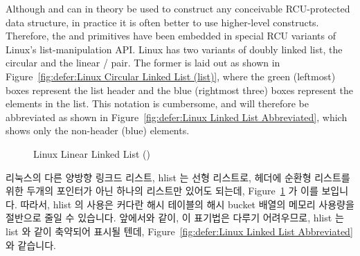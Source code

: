 Although  and
 can in theory be used to construct any
conceivable RCU-protected data structure, in practice it is often better
to use higher-level constructs.
Therefore, the  and
primitives have been embedded in special RCU variants of Linux's
list-manipulation API.
Linux has two variants of doubly linked list, the circular
 and the linear
/ pair.
The former is laid out as shown in
Figure~\ref{fig:defer:Linux Circular Linked List (list)},
where the green (leftmost) boxes represent the list header and the blue
(rightmost three) boxes represent the elements in the list.
This notation is cumbersome, and will therefore be abbreviated as shown in
Figure~\ref{fig:defer:Linux Linked List Abbreviated},
which shows only the non-header (blue) elements.
\fi

\begin{figure}[tb]
\centering
{}
\caption{Linux Linear Linked List ()}
\label{fig:defer:Linux Linear Linked List (hlist)}
\end{figure}

리눅스의 다른 양방향 링크드 리스트, hlist 는 선형 리스트로, 헤더에 순환형
리스트를 위한 두개의 포인터가 아닌 하나의 리스트만 있어도 되는데,
Figure~\ref{fig:defer:Linux Linear Linked List (hlist)} 가 이를 보입니다.
따라서, hlist 의 사용은 커다란 해시 테이블의 해시 bucket 배열의 메모리 사용량을
절반으로 줄일 수 있습니다.
앞에서와 같이, 이 표기법은 다루기 어려우므로, hlist 는 list 와 같이 축약되어
표시될 텐데,
Figure~\ref{fig:defer:Linux Linked List Abbreviated} 와 같습니다.

